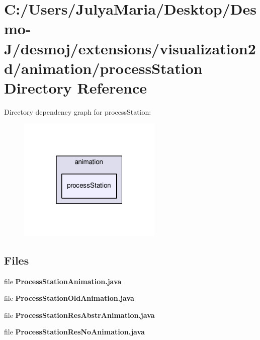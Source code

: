 \section{C\-:/\-Users/\-Julya\-Maria/\-Desktop/\-Desmo-\/\-J/desmoj/extensions/visualization2d/animation/process\-Station Directory Reference}
\label{dir_8eef1a7f12f955d131123ddffd9e6a7d}
Directory dependency graph for process\-Station\-:
\nopagebreak
\begin{figure}[H]
\begin{center}
\leavevmode
\includegraphics[width=194pt]{dir_8eef1a7f12f955d131123ddffd9e6a7d_dep}
\end{center}
\end{figure}
\subsection*{Files}
\begin{DoxyCompactItemize}
\item 
file {\bfseries Process\-Station\-Animation.\-java}
\item 
file {\bfseries Process\-Station\-Old\-Animation.\-java}
\item 
file {\bfseries Process\-Station\-Res\-Abstr\-Animation.\-java}
\item 
file {\bfseries Process\-Station\-Res\-No\-Animation.\-java}
\end{DoxyCompactItemize}
